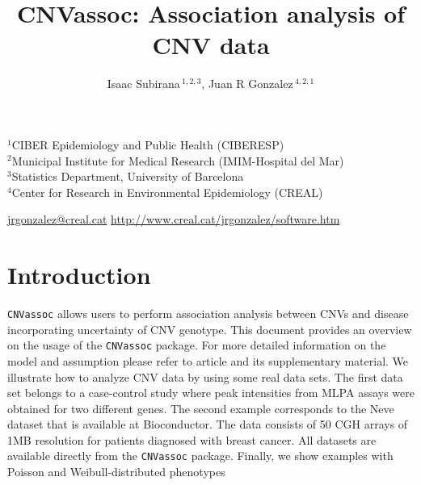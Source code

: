 \documentclass[11pt]{article}
\begin{document}

\title{\bf CNVassoc: Association analysis of CNV data}

\vspace{1cm}

\author{Isaac Subirana\,$^{1,2,3}$, Juan R Gonzalez\,$^{4,2,1}$}



\maketitle

\begin{center}

$^{1}$CIBER Epidemiology and Public Health (CIBERESP)\\
$^{2}$Municipal Institute for Medical Research (IMIM-Hospital del Mar)\\
$^{3}$Statistics Department, University of Barcelona\\
$^{4}$Center for Research in Environmental Epidemiology (CREAL)\\ 

\vspace{1cm}

\href{jrgonzalez@creal.cat}{jrgonzalez@creal.cat}
\href{http://www.creal.cat/jrgonzalez/software.htm}{http://www.creal.cat/jrgonzalez/software.htm}

\end{center}


\tableofcontents


\section{Introduction}

{\tt CNVassoc} allows users to perform association analysis between CNVs and disease incorporating
uncertainty of CNV genotype. This document provides an overview on the usage of the {\tt CNVassoc} package.
For more detailed information on the model and assumption please refer
to article \cite{GonSubEsc09} and its supplementary material. We illustrate how to analyze CNV data by using some real data sets.
The first data set belongs to a case-control study where peak intensities from MLPA assays were obtained for two different genes. 
The second example corresponds to the Neve dataset \cite{NevChiFri06} that is available at Bioconductor. 
The data consists of 50 CGH arrays of 1MB resolution for patients diagnosed with breast cancer. All datasets are available
directly from the \texttt{CNVassoc} package. Finally, we show examples with Poisson and Weibull-distributed phenotypes\\
\end{document}
